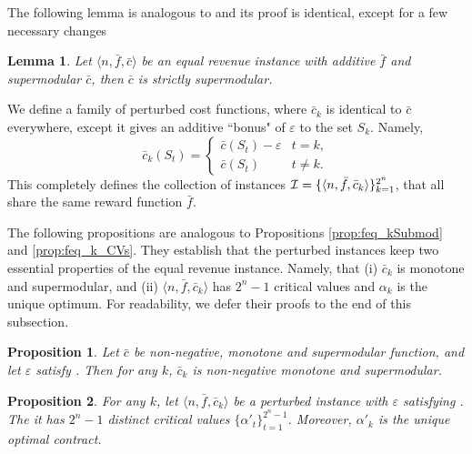 \documentclass[11pt]{article}
\newtheorem{lemma}{Lemma}
\newtheorem{proposition}{Proposition}
\newcommand{\eps}{\varepsilon}
\newcommand{\feq}{\bar{f}}
\newcommand{\ceq}{\bar{c}}
\newcommand{\eqRevInst}{\langle n,\feq,\ceq \rangle}
\begin{document}
The following lemma is analogous to  and its proof is identical, except for a few necessary changes
\begin{lemma}\label{lem:c_eqrev_strictly_supermodolar}
    Let $\eqRevInst$ be an equal revenue instance with additive $\feq$ and supermodular $\ceq$, then $\ceq$ is strictly supermodular. 
\end{lemma}

We define a family of perturbed cost functions, where $\ceq_k$ is identical to $\ceq$ everywhere, except it gives an additive ``bonus" of $\eps$ to the set $S_k$. Namely,
$$
\ceq_k(S_t) = 
\begin{cases}
\ceq(S_t) - \eps & t=k, \\
\ceq(S_t) & t \ne k.
\end{cases}
$$
This completely defines the collection of instances $\familyISupModC$, that all share the same reward function $\feq$.

The following propositions are analogous to Propositions \ref{prop:feq_kSubmod} and \ref{prop:feq_k_CVs}. 
They establish that the perturbed instances keep two essential properties of the equal revenue instance. Namely, that (i) $\ceq_k$ is monotone and supermodular, and (ii) $\langle n, \feq, \ceq_k\rangle$ has $2^n-1$ critical values and $\alpha_k$ is the unique optimum. 
For readability, we defer their proofs to the end of this subsection.

\begin{proposition}\label{prop:ceq_kSupMod}
    Let $\ceq$ be non-negative, monotone and supermodular function, and let $\eps$ satisfy .
    Then for any $k$, $\ceq_k$ is non-negative monotone and supermodular.
\end{proposition}

\begin{proposition}\label{prop:ceq_k_CVs}
    For any $k$, let $\langle n, \feq, \ceq_k \rangle$ be a perturbed instance with $\eps$ satisfying .
    The it has $2^n-1$ distinct critical values $\{\alpha'_t\}_{t=1}^{2^n-1}$. Moreover, $\alpha'_k$ is the unique optimal contract.
\end{proposition}
\end{document}

